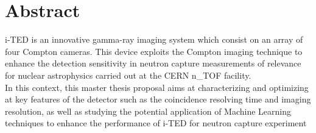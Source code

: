 \begingroup
\let\clearpage\relax
\let\cleardoublepage\relax
\let\cleardoublepage\relax

\chapter*{Abstract}
i-TED is an innovative gamma-ray imaging system which consist on an array of four Compton
cameras. This device exploits the Compton imaging technique to enhance the detection sensitivity
in neutron capture measurements of relevance for nuclear astrophysics carried out at the CERN
n\_TOF facility.\\

In this context, this master thesis proposal aims at characterizing and optimizing at key features of
the detector such as the coincidence resolving time and imaging resolution, as well as studying the
potential application of Machine Learning techniques to enhance the performance of i-TED for
neutron capture experiment

\endgroup

\vfill
